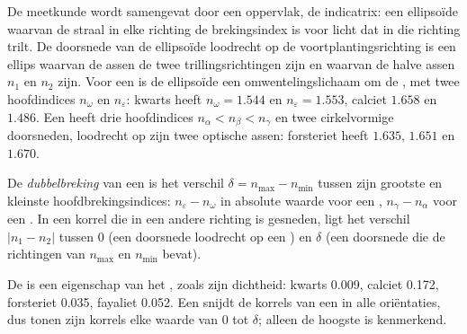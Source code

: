 De meetkunde wordt samengevat door een oppervlak, de indicatrix: een ellipsoïde waarvan de straal in elke richting de brekingsindex is voor
licht dat in die richting trilt. De doorsnede van de ellipsoïde loodrecht op de voortplantingsrichting is een ellips waarvan de assen de twee
trillingsrichtingen zijn en waarvan de halve assen $n_1$ en $n_2$ zijn. Voor een   is de ellipsoïde een omwentelingslichaam om
de , met twee hoofdindices $n_\omega$ en $n_\varepsilon$: kwarts heeft $n_\omega = 1.544$ en $n_\varepsilon = 1.553$, calciet
$1.658$ en $1.486$.
Een   heeft drie hoofdindices $n_\alpha < n_\beta < n_\gamma$ en twee cirkelvormige doorsneden, loodrecht op zijn twee optische
assen: forsteriet heeft $1.635$, $1.651$ en $1.670$.

\begin{definition}\label{def:b1:optical-mineralogy:birefringence}
De \emph{dubbelbreking} van een  is het verschil $\delta = n_{\max} - n_{\min}$ tussen zijn grootste en
kleinste hoofdbrekingsindices: $n_\varepsilon - n_\omega$ in absolute waarde voor een  , $n_\gamma - n_\alpha$ voor een .
In een korrel die in een andere richting is gesneden, ligt het verschil $|n_1 - n_2|$ tussen 0 (een doorsnede loodrecht op een ) en
$\delta$ (een doorsnede die de richtingen van $n_{\max}$ en $n_{\min}$ bevat).
\end{definition}

De  is een eigenschap van het , zoals zijn dichtheid: kwarts \num{0.009}, calciet \num{0.172}, forsteriet \num{0.035},
fayaliet \num{0.052}. Een  snijdt de korrels van een  in alle oriëntaties, dus tonen zijn korrels elke waarde van 0 tot $\delta$;
alleen de hoogste is kenmerkend.

